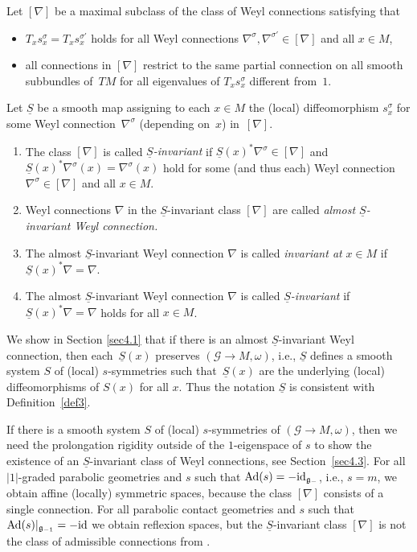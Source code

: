 \documentclass[pdftex]{sigma}
\newcommand{\om}{\omega}
\newcommand{\si}{\sigma}
\newcommand{\un}{\underline}
\newcommand{\ba}{\mathcal{G}}
\newcommand{\fg}{\mathfrak g}
\newcommand{\Ad}{{\rm Ad}}
\newcommand{\id}{{\rm id}}
\numberwithin{equation}{section}
\begin{document}
\begin{Definition} \label{almost-invariant-ws}
Let $[\nabla]$ be a maximal subclass of the class of Weyl connections satisfying that
\begin{itemize}\itemsep=0pt
\item $T_xs_x^\si=T_xs_x^{\si'}$ holds for all Weyl connections $\nabla^\si,\nabla^{\si'}\in [\nabla]$ and all $x\in M$,
\item all connections in $[\nabla]$ restrict to the same partial connection on all smooth subbundles of~$TM$ for all eigenvalues of $T_xs_x^\si$ dif\/ferent from~$1$.
\end{itemize}
Let $\un S$ be a smooth map assigning to each $x\in M$ the (local) dif\/feomorphism $s_x^\si$ for some Weyl connection~$\nabla^\si$ (depending on~$x$) in~$[\nabla]$.
\begin{enumerate}\itemsep=0pt
\item The class $[\nabla]$ is called \emph{$\un S$-invariant} if $\un S(x)^*\nabla^\si\in [\nabla]$ and $\un S(x)^*\nabla^\si(x)=\nabla^\si(x)$ hold for some (and thus each) Weyl connection $\nabla^\si\in [\nabla]$ and all $x\in M$.
\item Weyl connections $\nabla$ in the $\un S$-invariant class $[\nabla]$ are called \emph{almost $\un S$-invariant Weyl connection.}
\item The almost $\un S$-invariant Weyl connection $\nabla$ is called \emph{invariant at} $x\in M$ if $\un S(x)^*\nabla=\nabla$.
\item The almost $\un S$-invariant Weyl connection $\nabla$ is called \emph{$\un S$-invariant} if $\un S(x)^*\nabla=\nabla$ holds for all $x\in M$.
 \end{enumerate}
\end{Definition}

We show in Section \ref{sec4.1} that if there is an almost $\un S$-invariant Weyl connection, then each~$\un S(x)$ preserves $(\ba\to M,\om)$, i.e., $\un S$ def\/ines a smooth system $S$ of (local) $s$-symmetries such that~$\un{S}(x)$ are the underlying (local) dif\/feomorphisms of $S(x)$ for all $x$. Thus the notation $\un S$ is consistent with Def\/inition~\ref{def3}.

If there is a smooth system $S$ of (local) $s$-symmetries of $(\ba\to M,\om)$, then we need the prolongation rigidity outside of the $1$-eigenspace of $s$ to show the existence of an $\un S$-invariant class of Weyl connections, see Section~\ref{sec4.3}. For all $|1|$-graded parabolic geometries and $s$ such that $\Ad(s)=-\id_{\fg_-}$, i.e., $s=m$, we obtain af\/f\/ine (locally) symmetric spaces, because the class $[\nabla]$ consists of a single connection. For all parabolic contact geometries and $s$ such that $\Ad(s)|_{\fg_{-1}}=-\id$ we obtain ref\/lexion spaces, but the $\un S$-invariant class $[\nabla]$ is not the class of admissible connections from \cite{Loos}.
\end{document}
